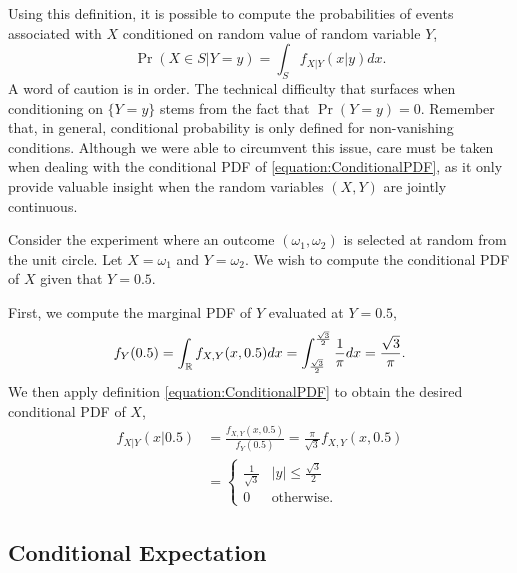 Using this definition, it is possible to compute the probabilities of events associated with $X$ conditioned on random value of random variable $Y$,
\begin{equation*}
\Pr (X \in S | Y = y) = \int_S f_{X|Y} (x|y) dx .
\end{equation*}
A word of caution is in order.
The technical difficulty that surfaces when conditioning on $\{ Y = y \}$ stems from the fact that $\Pr (Y = y) = 0$.
Remember that, in general, conditional probability is only defined for non-vanishing conditions.
Although we were able to circumvent this issue, care must be taken when dealing with the conditional PDF of \eqref{equation:ConditionalPDF}, as it only provide valuable insight when the random variables $(X, Y)$ are jointly continuous.

\begin{example}
Consider the experiment where an outcome $(\omega_1, \omega_2)$ is selected at random from the unit circle.
Let $X = \omega_1$ and $Y = \omega_2$.
We wish to compute the conditional PDF of $X$ given that $Y = 0.5$.

First, we compute the marginal PDF of $Y$ evaluated at $Y = 0.5$,
\begin{equation*}
f_Y (0.5) = \int_{\mathbb{R}} f_{X,Y} (x, 0.5) dx
= \int_{\frac{\sqrt{3}}{2}}^{\frac{\sqrt{3}}{2}} \frac{1}{\pi} dx
= \frac{\sqrt{3}}{\pi} .
\end{equation*}
We then apply definition \eqref{equation:ConditionalPDF} to obtain the desired conditional PDF of $X$,
\begin{equation*}
\begin{split}
f_{X|Y} ( x | 0.5 ) &= \frac{f_{X,Y} (x, 0.5)}{f_{Y} ( 0.5 ) }
= \frac{\pi}{\sqrt{3}} f_{X,Y} (x, 0.5) \\
&= \begin{cases} \frac{1}{\sqrt{3}} & |y| \leq \frac{\sqrt{3}}{2} \\
0 & \text{otherwise} . \end{cases}
\end{split}
\end{equation*}
\end{example}


\subsection{Conditional Expectation}

